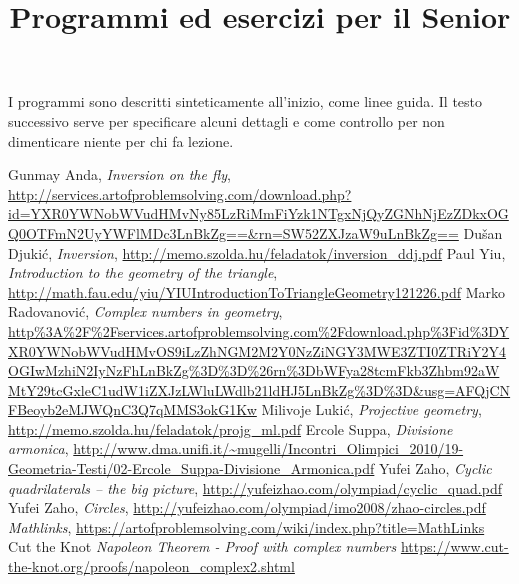 \documentclass[a4paper,10pt]{article}
\title{Programmi ed esercizi per il Senior}
\date{}
\begin{document}
\maketitle


I programmi sono descritti sinteticamente all'inizio, come linee guida. Il testo successivo serve per specificare alcuni dettagli e come controllo per non dimenticare niente per chi fa lezione. 

\vspace{1cm}
 
 \clearpage
 
 
 \clearpage
 
 
 \clearpage 

 \begin{thebibliography}{9}
	\bibitem[1]{} Gunmay Anda, \emph{Inversion on the fly}, \url{http://services.artofproblemsolving.com/download.php?id=YXR0YWNobWVudHMvNy85LzRiMmFiYzk1NTgxNjQyZGNhNjEzZDkxOGQ0OTFmN2UyYWFlMDc3LnBkZg==&rn=SW52ZXJzaW9uLnBkZg==}
	\bibitem[2]{} Du\v{s}an Djuki\' c, \emph{Inversion}, \url{http://memo.szolda.hu/feladatok/inversion_ddj.pdf}
	\bibitem[3]{} Paul Yiu, \emph{Introduction to the geometry of the triangle}, \url{http://math.fau.edu/yiu/YIUIntroductionToTriangleGeometry121226.pdf}
	\bibitem[4]{} Marko Radovanovi\'c, \emph{Complex numbers in geometry}, \url{http\%3A\%2F\%2Fservices.artofproblemsolving.com\%2Fdownload.php\%3Fid\%3DYXR0YWNobWVudHMvOS9iLzZhNGM2M2Y0NzZiNGY3MWE3ZTI0ZTRiY2Y4OGIwMzhiN2IyNzFhLnBkZg\%3D\%3D\%26rn\%3DbWFya28tcmFkb3Zhbm92aWMtY29tcGxleC1udW1iZXJzLWluLWdlb21ldHJ5LnBkZg\%3D\%3D&usg=AFQjCNFBeoyb2eMJWQnC3Q7qMMS3okG1Kw}
	\bibitem[5]{} Milivoje Luki\'c, \emph{Projective geometry}, \url{http://memo.szolda.hu/feladatok/projg_ml.pdf}
	\bibitem[6]{} Ercole Suppa, \emph{Divisione armonica}, \url{http://www.dma.unifi.it/~mugelli/Incontri_Olimpici_2010/19-Geometria-Testi/02-Ercole_Suppa-Divisione_Armonica.pdf}
	\bibitem[7]{} Yufei Zaho, \emph{Cyclic quadrilaterals -- the big picture}, \url{http://yufeizhao.com/olympiad/cyclic_quad.pdf}
	\bibitem[8]{} Yufei Zaho, \emph{Circles}, \url{http://yufeizhao.com/olympiad/imo2008/zhao-circles.pdf}
	\bibitem[9]{} \emph{Mathlinks}, \url{https://artofproblemsolving.com/wiki/index.php?title=MathLinks}
	Cut the Knot \emph{Napoleon Theorem - Proof with complex numbers} \url{ https://www.cut-the-knot.org/proofs/napoleon_complex2.shtml}
\end{thebibliography}
 
 
\end{document}
